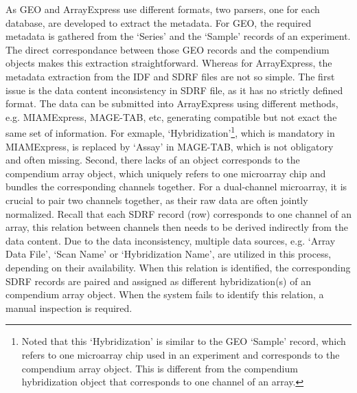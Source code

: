 As GEO and ArrayExpress use different formats, two parsers, one for each
database, are developed to extract the metadata.
%
For GEO, the required metadata is gathered from the `Series' and the
`Sample' records of an experiment.  The direct correspondance between
those GEO records and the compendium objects makes this extraction
straightforward.
%
Whereas for ArrayExpress, the metadata extraction from the IDF and SDRF
files are not so simple.
%
The first issue is the data content inconsistency in SDRF file, as it has
no strictly defined format.
%
The data can be submitted into ArrayExpress using different methods,
e.g. MIAMExpress, MAGE-TAB, etc, generating compatible but not exact the
same set of information.
%
For exmaple, `Hybridization'\footnote{Noted that this `Hybridization' is
  similar to the GEO `Sample' record, which refers to one microarray chip
  used in an experiment and corresponds to the compendium array object.
  This is different from the compendium hybridization object that
  corresponds to one channel of an array.}, which is mandatory in
MIAMExpress, is replaced by `Assay' in MAGE-TAB, which is not obligatory
and often missing.
%
%
Second, there lacks of an object corresponds to the compendium array
object, which uniquely refers to one microarray chip and bundles the
corresponding channels together.
%
For a dual-channel microarray, it is crucial to pair two channels
together, as their raw data are often jointly normalized.
%
Recall that each SDRF record (row) corresponds to one channel of an array,
this relation between channels then needs to be derived indirectly from the
data content.
%
Due to the data inconsistency, multiple data sources, e.g. `Array Data
File', `Scan Name' or `Hybridization Name', are utilized in this process,
depending on their availability.
%
When this relation is identified, the corresponding SDRF records are
paired and assigned as different hybridization(s) of an compendium array
object.
%
When the system fails to identify this relation, a manual inspection is
required.











